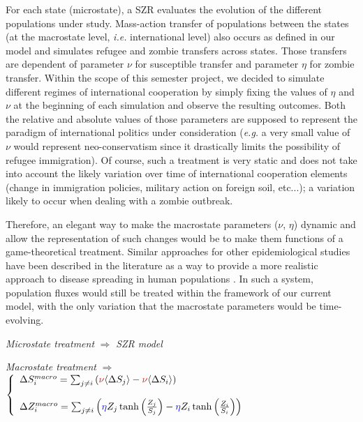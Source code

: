 \documentclass[11pt]{article} %
\begin{document}
For each state (microstate), a SZR evaluates the evolution of the different populations under study. Mass-action transfer of populations between the states (at the macrostate level, \textit{i.e.} international level) also occurs as defined in our model and simulates refugee and zombie transfers across states. Those transfers are dependent of parameter $\nu$ for susceptible transfer and parameter $\eta$ for zombie transfer. Within the scope of this semester project, we decided to simulate different regimes of international cooperation by simply fixing the values of $\eta$ and $\nu$ at the beginning of each simulation and observe the resulting outcomes. Both the relative and absolute values of those parameters are supposed to represent the paradigm of international politics under consideration (\textit{e.g.} a very small value of $\nu$ would represent neo-conservatism since it drastically limits the possibility of refugee immigration). Of course, such a treatment is very static and does not take into account the likely variation over time of international cooperation elements (change in immigration policies, military action on foreign soil, etc...); a variation likely to occur when dealing with a zombie outbreak.

Therefore, an elegant way to make the macrostate parameters ($\nu$, $\eta$) dynamic and allow the representation of such changes would be to make them functions of a game-theoretical treatment. Similar approaches for other epidemiological studies have been described in the literature as a way to provide a more realistic approach to disease spreading in human populations \cite{funk2010modelling, reluga2010game, reluga2009sis}. In such a system, population fluxes would still be treated within the framework of our current model, with the only variation that the macrostate parameters would be time-evolving. 

\bigskip

\textit{Microstate treatment} $\Rightarrow$ \textit{SZR model} 

\bigskip

\textit{Macrostate treatment} $\Rightarrow$  $\left\{
	\begin{array}{l l}
		\Delta S_{i}^{macro} =  \sum_{j\neq i}{ \left( \textcolor{red}{\nu} \langle \Delta S_{j} \rangle - \textcolor{red}{\nu}  \langle \Delta S_{i} \rangle \right) }	
    \\
    \\
    		\Delta Z_{i}^{macro} = \sum_{j\neq i}{\left( \textcolor{blue}{\eta} Z_{j}\tanh \left( \frac{Z_{j}}{S_{j}}\right) -\textcolor{blue}{\eta} Z_{i}\tanh \left( \frac{Z_{i}}{S_{i}}\right) \right)}

	\end{array} \right.$
\end{document}
